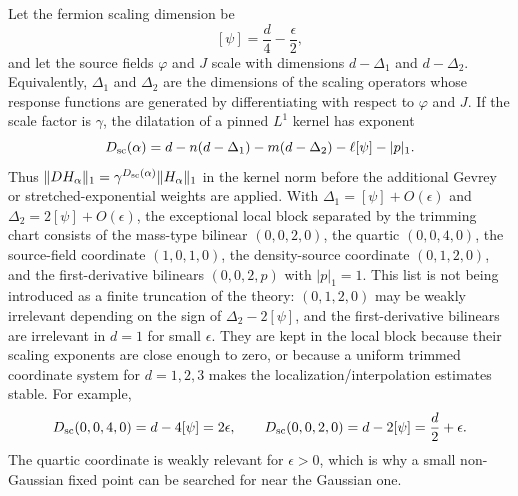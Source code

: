 Let the fermion scaling dimension be
\[
  [\psi]=\frac d4-\frac{\epsilon}{2},
\]
and let the source fields \(\varphi\) and \(J\) scale with dimensions
\(d-\Delta_1\) and \(d-\Delta_2\).  Equivalently, \(\Delta_1\) and
\(\Delta_2\) are the dimensions of the scaling operators whose response
functions are generated by differentiating with respect to \(\varphi\) and
\(J\).  If the scale factor is \(\gamma\), the dilatation of a pinned
\(L^1\) kernel has exponent
\begin{equation}
  D_{\rm sc}(\alpha)
  =
  d
  -n(d-\Delta_1)
  -m(d-\Delta_2)
  -\ell[\psi]
  -|p|_1 .
  \label{eq:fermionic-rg-kernel-scaling-dimension}
\end{equation}
Thus \(\|D H_\alpha\|_1=\gamma^{D_{\rm sc}(\alpha)}\|H_\alpha\|_1\) in the
kernel norm before the additional Gevrey or stretched-exponential weights are
applied.  With \(\Delta_1=[\psi]+O(\epsilon)\) and
\(\Delta_2=2[\psi]+O(\epsilon)\), the exceptional local block separated by
the trimming chart consists of the mass-type bilinear \((0,0,2,0)\), the
quartic \((0,0,4,0)\), the source-field coordinate \((1,0,1,0)\), the
density-source coordinate \((0,1,2,0)\), and the first-derivative bilinears
\((0,0,2,p)\) with \(|p|_1=1\).  This list is not being introduced as a
finite truncation of the theory: \((0,1,2,0)\) may be weakly irrelevant
depending on the sign of \(\Delta_2-2[\psi]\), and the first-derivative
bilinears are irrelevant in \(d=1\) for small \(\epsilon\).  They are kept in
the local block because their scaling exponents are close enough to zero, or
because a uniform trimmed coordinate system for \(d=1,2,3\) makes the
localization/interpolation estimates stable.  For example,
\begin{equation}
  D_{\rm sc}(0,0,4,0)=d-4[\psi]=2\epsilon,
  \qquad
  D_{\rm sc}(0,0,2,0)=d-2[\psi]=\frac d2+\epsilon .
  \label{eq:fermionic-rg-quartic-mass-dimensions}
\end{equation}
The quartic coordinate is weakly relevant for \(\epsilon>0\), which is why a
small non-Gaussian fixed point can be searched for near the Gaussian one.

